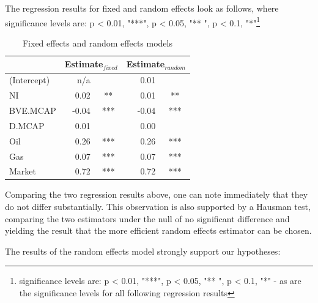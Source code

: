 \documentclass[a4paper]{article}
\begin{document}
The regression results for fixed and random effects look as follows, where significance levels are: p < 0.01, "***", p < 0.05, "** ", p < 0.1, "*"\footnote{significance levels are: p < 0.01, "***", p < 0.05, "** ", p < 0.1, "*" - as are the significance levels for all following regression results}

\begin{table}[ht]
\centering
\begin{tabular}{l|rc|rc}
\hline
\hline
& \multicolumn{2}{c}{Estimate$_{fixed}$} & \multicolumn{2}{|c}{Estimate$_{random}$}  \\ 
\hline
(Intercept) & n/a &  & 0.01 &  \\
NI & 0.02 & ** & 0.01 & ** \\ 
BVE.MCAP & -0.04 & *** & -0.04 & *** \\ 
D.MCAP & 0.01 &  & 0.00 & \\ 
Oil & 0.26 & *** & 0.26 &***  \\ 
Gas & 0.07 & *** & 0.07 & *** \\ 
Market & 0.72 & *** & 0.72 & *** \\ 
\hline
\hline
\end{tabular}
\label{}
\caption{Fixed effects and random effects models}
\end{table}

Comparing the two regression results above, one can note immediately that they do not differ substantially. This observation is also supported by a Hausman test, comparing the two estimators under the null of no significant difference and yielding the result that the more efficient random effects estimator can be chosen. 

The results of the random effects model strongly support our hypotheses:
\end{document}
